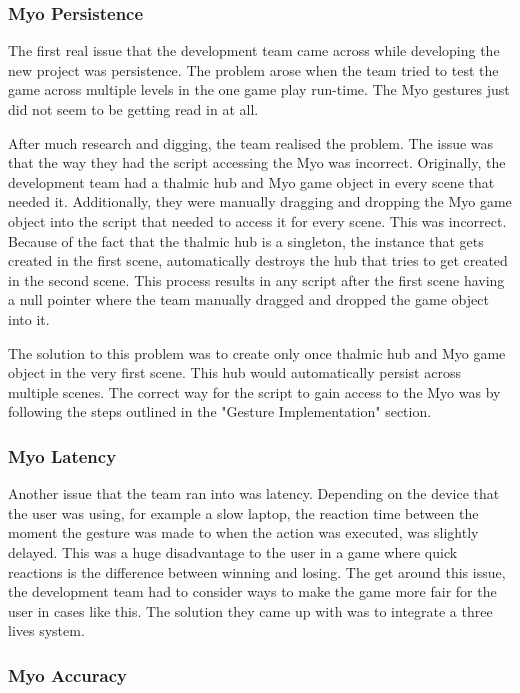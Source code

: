 \documentclass{article}
\begin{document}
\subsubsection{Myo Persistence}
The first real issue that the development team came across while developing the new project was persistence. The problem arose when the team tried to test the game across multiple levels in the one game play run-time. The Myo gestures just did not seem to be getting read in at all.

\bigskip

After much research and digging, the team realised the problem. The issue was that the way they had the script accessing the Myo was incorrect. Originally, the development team had a thalmic hub and Myo game object in every scene that needed it. Additionally, they were manually dragging and dropping the Myo game object into the script that needed to access it for every scene. This was incorrect. Because of the fact that the thalmic hub is a singleton, the instance that gets created in the first scene, automatically destroys the hub that tries to get created in the second scene. This process results in any script after the first scene having a null pointer where the team manually dragged and dropped the game object into it. 

\bigskip

The solution to this problem was to create only once thalmic hub and Myo game object in the very first scene. This hub would automatically persist across multiple scenes. The correct way for the script to gain access to the Myo was by following the steps outlined in the "Gesture Implementation" section.

\subsubsection{Myo Latency}

Another issue that the team ran into was latency. Depending on the device that the user was using, for example a slow laptop, the reaction time between the moment the gesture was made to when the action was executed, was slightly delayed. This was a huge disadvantage to the user in a game where quick reactions is the difference between winning and losing. The get around this issue, the development team had to consider ways to make the game more fair for the user in cases like this. The solution they came up with was to integrate a three lives system.

\subsubsection{Myo Accuracy}
\end{document}
